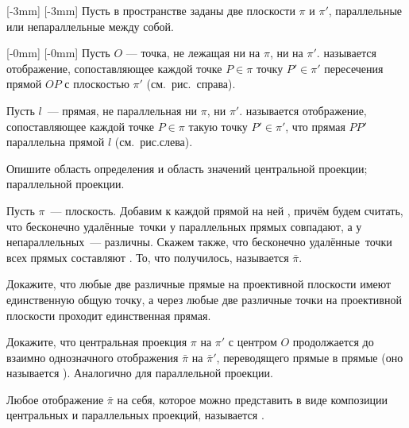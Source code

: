 \documentclass[a4paper,12pt]{article}
\newcommand{\rightpicture}[4]%
{\ifthenelse{\lengthtest{10mm>#3mm}}%
{\marginnote{\hbox to #1 {\hss\texttt{[image: \#4]}}}[-#2]}%
{\marginnote{\hbox to #1 {\hss\texttt{[image: \#4]}}}[-#2]}}
\newcommand{\leftpicture}[4]%
{\ifthenelse{\lengthtest{10mm>#3mm}}%
{\reversemarginpar\marginnote{\hbox to -#1 {\texttt{[image: \#4]}\hss}}[-#2]\normalmarginpar}%
{\reversemarginpar\marginnote{\hbox to -#1 {\texttt{[image: \#4]}\hss}}[-#2]\normalmarginpar}}
\begin{document}



\rightpicture{0mm}{3mm}{43mm}{proj_geom-1}
 Пусть в пространстве заданы две плоскости $\pi$ и $\pi'$,
параллельные или непараллельные между собой.

\leftpicture{0mm}{0mm}{43mm}{proj_geom-2}
Пусть $O$ --- точка,
не лежащая ни на $\pi$, ни на $\pi'$.  называется отображение,
сопоставляющее каждой точке $P\in\pi$ точку $P'\in\pi'$ пересечения
прямой $OP$ с плоскостью $\pi'$ (см.~рис.~справа).

Пусть $l$~--- прямая, не параллельная ни $\pi$, ни $\pi'$.
 называется
отображение, сопоставляющее каждой точке $P\in\pi$ такую точку
$P'\in\pi'$, что прямая $PP'$ параллельна прямой $l$
(см.~рис.слева).


 Опишите область определения и область значений центральной
проекции; параллельной проекции. 


 Пусть $\pi$~--- плоскость. Добавим к каждой прямой на ней
, причём будем считать, что
 бесконечно удалённые\ точки у параллельных прямых совпадают,
а у непараллельных~--- различны. Скажем также, что  бесконечно
удалённые\ точки всех прямых составляют . То, что получилось, называется
 $\bar\pi$. 

 Докажите, что любые две различные прямые на проективной
плоскости имеют единственную общую точку, а через любые две
различные точки на проективной плоскости проходит единственная
прямая. 

 Докажите, что центральная проекция $\pi$ на $\pi'$ с центром
$O$ продолжается до взаимно однозначного отображения $\bar\pi$ на
$\bar\pi'$, переводящего прямые в прямые (оно называется
).
Аналогично для параллельной проекции. 

 Любое отображение $\bar\pi$ на себя, которое можно представить
в виде композиции центральных и параллельных проекций, называется
. 
\end{document}
